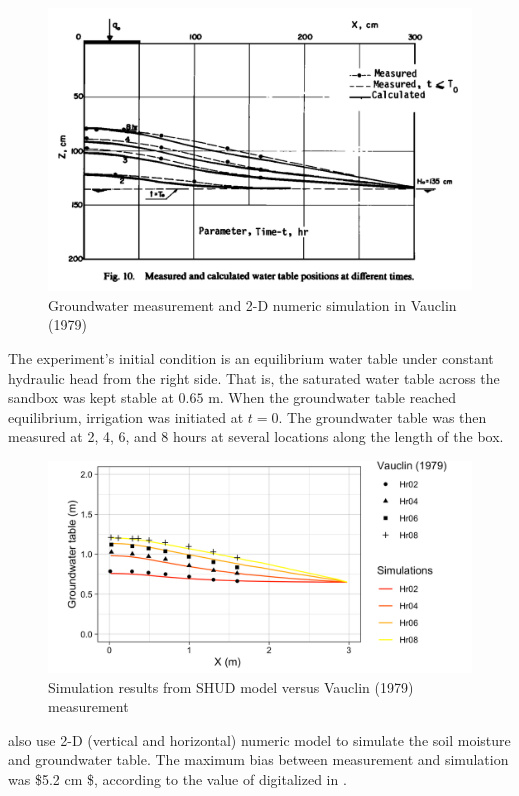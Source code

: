 \documentclass[]{scrbook}
\begin{document}
\begin{figure}
\centering
\includegraphics{Fig/Example/Vauclin/v1.png}
\caption{Groundwater measurement and 2-D numeric simulation in Vauclin
(1979)}
\end{figure}

The experiment's initial condition is an equilibrium water table under
constant hydraulic head from the right side. That is, the saturated
water table across the sandbox was kept stable at \(0.65\) m. When the
groundwater table reached equilibrium, irrigation was initiated at
\(t = 0\). The groundwater table was then measured at 2, 4, 6, and 8
hours at several locations along the length of the box.

\begin{figure}
\centering
\includegraphics{Fig/Example/Vauclin/best.png}
\caption{Simulation results from SHUD model versus Vauclin (1979)
measurement}
\end{figure}

\citep{Vauclin1979} also use 2-D (vertical and horizontal) numeric model
to simulate the soil moisture and groundwater table. The maximum bias
between measurement and simulation was \$5.2 cm \$, according to the
value of digitalized in \citealp[Fig. 10]{Vauclin1979}.
\end{document}
